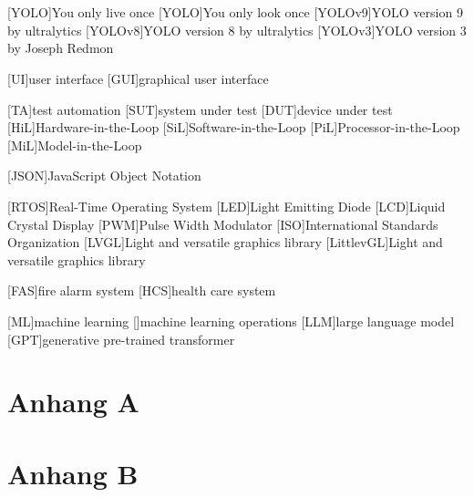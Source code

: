 \documentclass[Bachelor,BIC,english,fhCitStyle,IEEE]{BASE/twbook} %
\begin{document}
\printbib                                                        %
\clearpage

\listoffigures                                                   %
\clearpage

\listoftables                                                    %
\clearpage

\listoflistings                                                  %
\clearpage

{}
\chapter*{\listacroname}
\begin{acronym}[YOLO]
    [YOLO]{You only live once}
    [YOLO]{You only look once}
    [YOLOv9]{YOLO version 9 by ultralytics}
    [YOLOv8]{YOLO version 8 by ultralytics}
    [YOLOv3]{YOLO version 3 by Joseph Redmon}
\end{acronym}
\begin{acronym}[UI]
    [UI]{user interface}
    [GUI]{graphical user interface}
\end{acronym}
\begin{acronym}[TEST]
    [TA]{test automation}
    [SUT]{system under test}
    [DUT]{device under test}
    [HiL]{Hardware-in-the-Loop}
    [SiL]{Software-in-the-Loop}
    [PiL]{Processor-in-the-Loop}
    [MiL]{Model-in-the-Loop}
\end{acronym}
\begin{acronym}[TECH]
    [JSON]{JavaScript Object Notation}
\end{acronym}
\begin{acronym}[EMBSYS]
    [RTOS]{Real-Time Operating System}
    [LED]{Light Emitting Diode}
    [LCD]{Liquid Crystal Display}
    [PWM]{Pulse Width Modulator}
    [ISO]{International Standards Organization}
    [LVGL]{Light and versatile graphics library}
    [LittlevGL]{Light and versatile graphics library}
\end{acronym}
\begin{acronym}[SSGNET]
    [FAS]{fire alarm system}
    [HCS]{health care system}
\end{acronym}
\begin{acronym}[MACHINELEARNING]
    [ML]{machine learning}
    []{machine learning operations}
    [LLM]{large language model}
    [GPT]{generative pre-trained transformer}
\end{acronym}

\clearpage
\appendix
\chapter{Anhang A}
\clearpage
\chapter{Anhang B}
\end{document}
